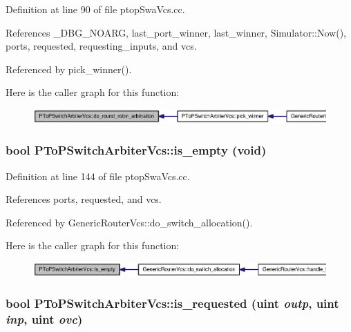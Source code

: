 Definition at line 90 of file ptopSwaVcs.cc.

References \_\-DBG\_\-NOARG, last\_\-port\_\-winner, last\_\-winner, Simulator::Now(), ports, requested, requesting\_\-inputs, and vcs.

Referenced by pick\_\-winner().

Here is the caller graph for this function:\nopagebreak
\begin{figure}[H]
\begin{center}
\leavevmode
\includegraphics[width=420pt]{classPToPSwitchArbiterVcs_e8adb19a43c5674bae5f4cab64b58a14_icgraph}
\end{center}
\end{figure}
\subsubsection[{is\_\-empty}]{\setlength{\rightskip}{0pt plus 5cm}bool PToPSwitchArbiterVcs::is\_\-empty (void)}\label{classPToPSwitchArbiterVcs_a346b5f33fbb252e2ec942caa7243922}




Definition at line 144 of file ptopSwaVcs.cc.

References ports, requested, and vcs.

Referenced by GenericRouterVcs::do\_\-switch\_\-allocation().

Here is the caller graph for this function:\nopagebreak
\begin{figure}[H]
\begin{center}
\leavevmode
\includegraphics[width=420pt]{classPToPSwitchArbiterVcs_a346b5f33fbb252e2ec942caa7243922_icgraph}
\end{center}
\end{figure}
\subsubsection[{is\_\-requested}]{\setlength{\rightskip}{0pt plus 5cm}bool PToPSwitchArbiterVcs::is\_\-requested ({\bf uint} {\em outp}, \/  {\bf uint} {\em inp}, \/  {\bf uint} {\em ovc})}\label{classPToPSwitchArbiterVcs_b260fc3fbec7be3f4c5cce7a73d96bca}




